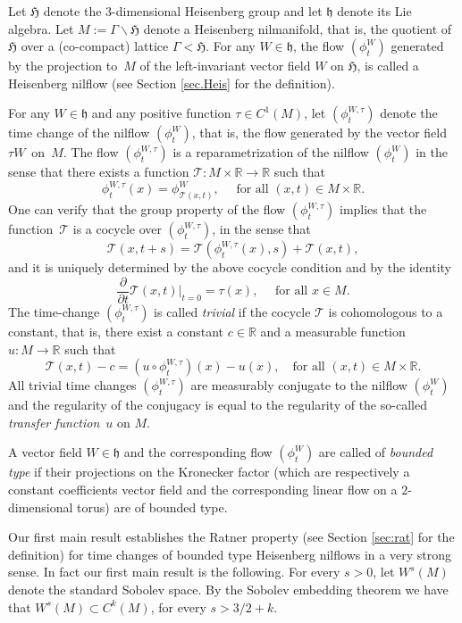 \documentclass[JEP,XML,SOM,Unicode,NoEqCountersInSection]{cedram}
\let\mathcal\mathscr
\theoremstyle{definition}
\theoremstyle{plain}
\newcommand\RR{\mathbb{R}}
\begin{document}
Let $\mathfrak H$ denote the $3$-dimensional Heisenberg group and let $\mathfrak h$ denote its Lie algebra. Let $M:= \Gamma \backslash \mathfrak H$ denote a Heisenberg
nilmanifold, that is, the quotient of $\mathfrak H$ over a (\hbox{co-compact}) lattice $\Gamma <\mathfrak H$. For any $W\in \mathfrak h$, the flow $(\phi_t^{W})$ generated by the projection to~$M$ of the left-invariant vector field $W$ on $\mathfrak H$, is called a Heisenberg nilflow (see Section \ref{sec.Heis} for the definition).

For any $W\in \mathfrak h$ and any positive function $\tau\in C^1(M)$, let $(\phi_t^{W,\tau})$ denote the time change of the nilflow $(\phi_t^{W})$, that is, the flow generated by the vector field $\tau W$~on~$M$. The
flow $(\phi_t^{W,\tau})$ is a reparametrization of the nilflow $(\phi_t^{W})$ in the sense that there exists a
function $\mathcal T : M \times \RR \to \RR$ such that
\[
\phi_t^{W,\tau} (x) = \phi_{\mathcal T(x,t)} ^{W}, \quad \text{ for all } (x,t) \in M\times \RR.
\]
One can verify that the group property of the flow $(\phi_t^{W,\tau})$ implies that the function~$\mathcal T$ is a cocycle over $(\phi_t^{W,\tau})$, in the sense that
\[
\mathcal T(x,t+s) = \mathcal T (\phi_t^{W,\tau}(x),s) + \mathcal T (x,t),
\]
and it is uniquely determined by the above cocycle condition and by the identity
\[
\frac{\partial}{\partial t} {\mathcal T}(x, t) \vert _{t=0} = \tau (x), \quad \text{ for all }x\in M.
\]
The time-change $(\phi_t^{W,\tau})$ is called \emph{trivial} if the cocycle $\mathcal T$ is cohomologous to a constant, that is, there exist a constant $c\in \RR$ and a measurable function $u:M\to \RR$ such that
\[\mathcal T(x,t) -c = (u\circ \phi_t^{W,\tau})(x) - u(x), \quad \text{for all } (x,t) \in M\times \RR.\]
All trivial time changes $(\phi_t^{W,\tau})$ are measurably conjugate to the nilflow $(\phi_t^{W})$ and
the regularity of the conjugacy is equal to the regularity of the so-called \emph{transfer function}~$u$ on $M$.

A vector field $W\in \mathfrak h$ and the corresponding flow $(\phi_t^{W})$ are called of \emph{bounded type} if their projections on the Kronecker factor (which are respectively
a constant coefficients vector field and the corresponding linear flow on a $2$-dimensional torus) are of bounded type.

Our first main result establishes the Ratner property (see Section \ref{sec:rat} for the definition) for time changes of bounded type Heisenberg nilflows in a very strong sense. In fact our first main result is the following.
For every $s>0$, let $W^s(M)$ \hbox{denote} the standard Sobolev space. By the Sobolev embedding theorem we have that $W^s(M) \subset C^k(M)$, for every $s> 3/2 + k$.
\end{document}
